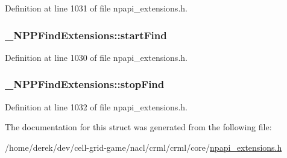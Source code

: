 Definition at line 1031 of file npapi\_\-extensions.h.

\hypertarget{struct___n_p_p_find_extensions_a81b270222f796f8df0dc7cf771c854bb}{
\subsubsection[{startFind}]{ {\bf \_\-NPPFindExtensions::startFind}}}
\label{struct___n_p_p_find_extensions_a81b270222f796f8df0dc7cf771c854bb}


Definition at line 1030 of file npapi\_\-extensions.h.

\hypertarget{struct___n_p_p_find_extensions_a86a735fce593c126bd79a5cabf8cccfe}{
\subsubsection[{stopFind}]{ {\bf \_\-NPPFindExtensions::stopFind}}}
\label{struct___n_p_p_find_extensions_a86a735fce593c126bd79a5cabf8cccfe}


Definition at line 1032 of file npapi\_\-extensions.h.



The documentation for this struct was generated from the following file:\begin{DoxyCompactItemize}
\item 
/home/derek/dev/cell-\/grid-\/game/nacl/crml/crml/core/\hyperlink{npapi__extensions_8h}{npapi\_\-extensions.h}\end{DoxyCompactItemize}
